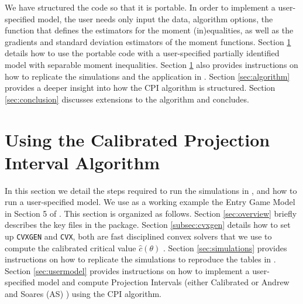 \documentclass[12pt]{article}
\def\code#1{\texttt{#1}}
\begin{document}
We have structured the code so that it is portable.  In order to implement a user-specified model, the user needs only input the data, algorithm options, the function that defines the estimators for the moment (in)equalities, as well as the gradients and standard deviation estimators of the moment functions.    Section \ref{sec:using} details how to use the portable code with a user-specified partially identified model with separable moment inequalities.  Section \ref{sec:using} also provides instructions on how to replicate the simulations and the application in .     Section \ref{sec:algorithm} provides a deeper insight into how the CPI algorithm is structured. Section \ref{sec:conclusion} discusses extensions to the algorithm and concludes.


\section{Using the Calibrated Projection Interval Algorithm} \label{sec:using}
In this section we detail the steps required to run the simulations in , and how to run  a user-specified model.  We use as a working example the Entry Game Model in Section 5 of .   This section is organized as follows.  Section \ref{sec:overview} briefly describes the key files in the package.  Section \ref{subsec:cvxgen} details how to set up \code{CVXGEN} and \code{CVX}, both are fast disciplined convex solvers that we use to compute the calibrated critical value $\hat c(\theta)$ \cite{mattingley2012cvxgen,cvx,gb08}.  Section \ref{sec:simulations} provides instructions on how to replicate the simulations to reproduce the tables in .  Section \ref{sec:usermodel} provides instructions on how to implement a user-specified model and compute Projection Intervals (either Calibrated or Andrew and Soares (AS) \cite{andrews2010inference}) using the CPI algorithm.
\end{document}
